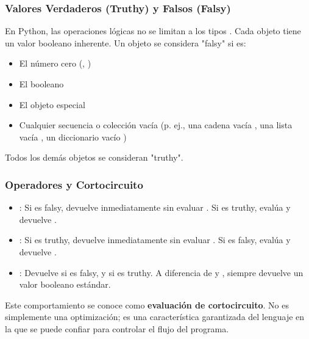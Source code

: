 \subsubsection*{Valores Verdaderos (Truthy) y Falsos (Falsy)}
En Python, las operaciones lógicas no se limitan a los tipos . Cada objeto tiene un valor booleano inherente. Un objeto se considera "falsy" si es:
\begin{itemize}
    \item El número cero (, )
    \item El booleano 
    \item El objeto especial 
    \item Cualquier secuencia o colección vacía (p. ej., una cadena vacía , una lista vacía \code{[]}, un diccionario vacío \code{{}})
\end{itemize}
Todos los demás objetos se consideran "truthy".

\subsubsection*{Operadores y Cortocircuito}
\begin{itemize}
    \item {}: Si  es falsy, devuelve  inmediatamente sin evaluar . Si  es truthy, evalúa y devuelve .
    \item {}: Si  es truthy, devuelve  inmediatamente sin evaluar . Si  es falsy, evalúa y devuelve .
    \item {}: Devuelve  si  es falsy, y  si  es truthy. A diferencia de  y , siempre devuelve un valor booleano estándar.
\end{itemize}
Este comportamiento se conoce como \textbf{evaluación de cortocircuito}. No es simplemente una optimización; es una característica garantizada del lenguaje en la que se puede confiar para controlar el flujo del programa.

